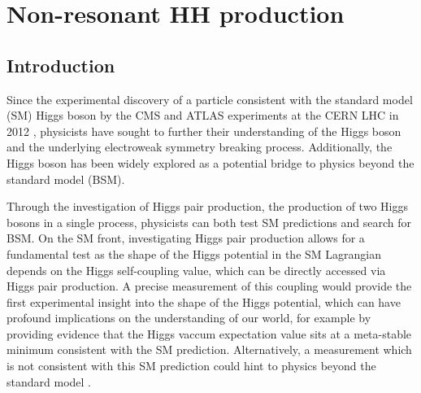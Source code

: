 \chapter{Non-resonant HH production} \label{Chapter:HH_NonResonant}

\section{Introduction}\label{section:introduction_HH}
Since the experimental discovery of a particle consistent with the standard model (SM) Higgs boson by the CMS and ATLAS experiments at the CERN 
LHC in 2012 \cite{Aad:2012tfa,Chatrchyan:2012ufa,Chatrchyan:2013lba}, physicists
have sought to further their understanding of the Higgs boson and the underlying electroweak symmetry breaking process. Additionally, the Higgs boson
has been widely explored as a potential bridge to physics beyond the standard model (BSM).

Through the investigation of Higgs pair production, the production of two Higgs bosons in a single process, physicists can both test SM predictions and 
search for BSM. On the SM front, investigating Higgs pair production allows for a fundamental test as the shape of the Higgs potential in the SM Lagrangian 
depends on the Higgs self-coupling value, which can be directly accessed via Higgs pair production. A precise measurement of this coupling would provide the first experimental insight 
into the shape of the Higgs potential, which can have profound implications on the understanding of our world, for example by providing evidence that the Higgs vaccum expectation value sits at a 
meta-stable minimum consistent with the SM prediction. Alternatively, a measurement which is not consistent with this SM prediction could hint to physics beyond the standard model \cite{10.3389/fspas.2018.00040}. 

